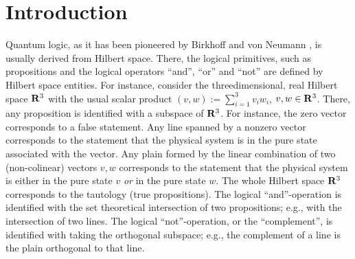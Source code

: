\maketitle

\begin {abstract}
We use Greechie diagrams to construct finite orthomodular lattices
`realizable' in the orthomodular lattice of subspaces in a threedimensional
Hilbert space such that the set of two-valued states is not `large' (i.e.,
full, separating, unital, nonempty, resp.). We discuss the number of
elements
of such orthomodular lattices, of their sets of (ortho)generators and of their
subsets which do not admit `large' set of two-valued states. We show
connections with other results of this type.
\end {abstract}




\section {Introduction}


Quantum logic, as it has been pioneered by Birkhoff and von Neumann
\cite{birk-vonneu}, is usually derived from Hilbert space. There, the
logical primitives, such as propositions and the logical operators ``and'',
``or'' and ``not'' are defined by Hilbert space entities. For instance,
consider the threedimensional, real Hilbert space ${\bf R}^3$ with the usual
scalar product $(v,w):=\sum_{i=1}^3v_iw_i$, $v,w\in {\bf R}^3$. There, any
proposition is identified with a subspace of ${\bf R}^3$. For instance, the zero
vector corresponds to a false statement. Any line spanned by a nonzero
vector corresponds to the statement that the physical system is in the pure
state associated with the vector. Any plain formed by the linear combination
of two (non-colinear) vectors $v,w$ corresponds to the statement that the
physical system is either in the pure state $v$ {\em or\/} in the pure state
$w$. The whole Hilbert space ${\bf R}^3$ corresponds to the tautology (true
propositions). The logical ``and''-operation is identified with the set
theoretical intersection of two propositions; e.g., with the intersection of
two lines. The logical ``not''-operation, or the ``complement'', is
identified with taking the orthogonal subspace; e.g., the complement of a
line is the plain orthogonal to that line.

